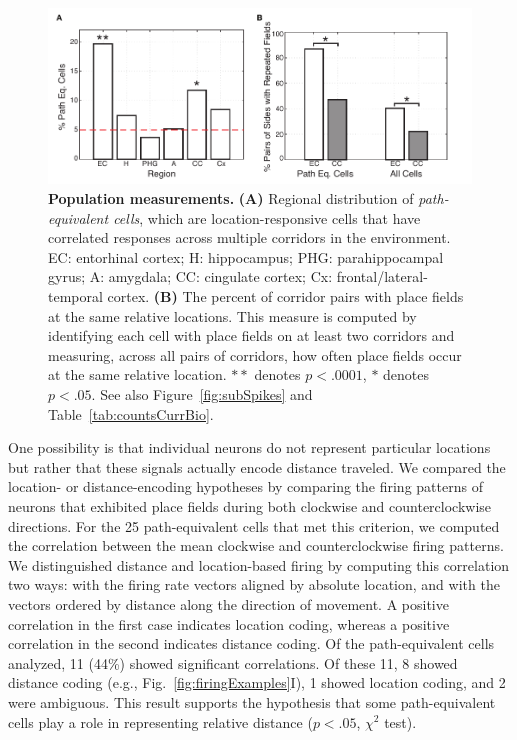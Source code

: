 \begin{figure}[t]
\centering
\includegraphics[width=.99\textwidth]{./tex/linearGrids/figs/Figure4}
\caption[Population measurements]{\textbf{Population measurements.}  \textbf{(A)} Regional distribution of \emph{path-equivalent cells}, which are location-responsive cells that have correlated responses across multiple corridors in the environment. EC: entorhinal cortex; H: hippocampus; PHG: parahippocampal gyrus; A: amygdala; CC: cingulate cortex; Cx: frontal/lateral-temporal cortex. \textbf{(B)} The percent of corridor pairs with place fields at the same relative locations.  This measure is computed by identifying each cell with place fields on at least two corridors and measuring, across all pairs of corridors, how often place fields occur at the same relative location.  $**$ denotes $p<.0001$, $*$ denotes $p<.05$. See also Figure~\ref{fig:subSpikes} and Table~\ref{tab:countsCurrBio}.}
\label{fig:population}
\end{figure}

One possibility is that individual neurons do not represent particular locations but rather that these  signals actually encode distance traveled.  We compared the location- or distance-encoding hypotheses  by comparing the firing patterns of neurons that exhibited place fields during both clockwise and counterclockwise directions. For the 25 path-equivalent cells that met this criterion, we computed the correlation between the mean clockwise and counterclockwise firing patterns. We distinguished distance and location-based firing by computing this correlation two ways: with the firing rate vectors aligned by absolute location, and with the vectors ordered by distance along the direction of movement. A positive correlation in the first case indicates location coding, whereas a positive correlation in the second indicates distance coding. Of the path-equivalent cells analyzed, 11 (44\%) showed significant correlations. Of these 11, 8 showed distance coding  (e.g., Fig.~\ref{fig:firingExamples}I), 1 showed location coding, and 2 were ambiguous. This result supports the hypothesis that some path-equivalent cells  play a role in representing relative distance  ($p<.05$, $\chi^2$ test).


